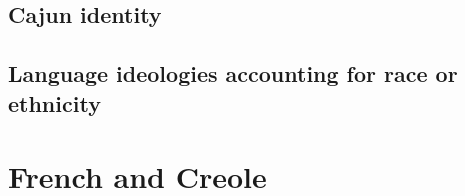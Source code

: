     \subsection{Cajun identity}
    \subsection{Language ideologies accounting for race or ethnicity}
  \section{French and Creole}
